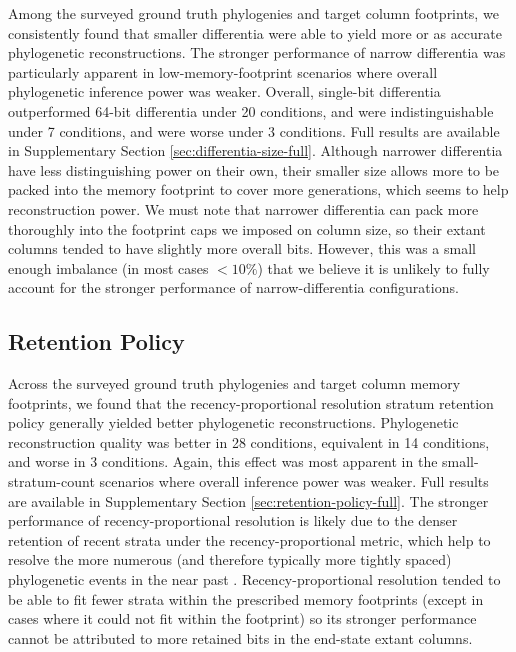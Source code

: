 Among the surveyed ground truth phylogenies and target column footprints, we consistently found that smaller differentia were able to yield more or as accurate phylogenetic reconstructions.
The stronger performance of narrow differentia was particularly apparent in low-memory-footprint scenarios where overall phylogenetic inference power was weaker.
Overall, single-bit differentia outperformed 64-bit differentia under 20 conditions, and were indistinguishable under 7 conditions, and were worse under 3 conditions.
Full results are available in Supplementary Section \ref{sec:differentia-size-full}.
Although narrower differentia have less distinguishing power on their own, their smaller size allows more to be packed into the memory footprint to cover more generations, which seems to help reconstruction power.
We must note that narrower differentia can pack more thoroughly into the footprint caps we imposed on column size, so their extant columns tended to have slightly more overall bits.
However, this was a small enough imbalance (in most cases $<10\%$) that we believe it is unlikely to fully account for the stronger performance of narrow-differentia configurations.

\subsection{Retention Policy}

Across the surveyed ground truth phylogenies and target column memory footprints, we found that the recency-proportional resolution stratum retention policy generally yielded better phylogenetic reconstructions.
Phylogenetic reconstruction quality was better in 28 conditions, equivalent in 14 conditions, and worse in 3 conditions.
Again, this effect was most apparent in the small-stratum-count scenarios where overall inference power was weaker.
Full results are available in Supplementary Section \ref{sec:retention-policy-full}.
The stronger performance of recency-proportional resolution is likely due to the denser retention of recent strata under the recency-proportional metric, which help to resolve the more numerous (and therefore typically more tightly spaced) phylogenetic events in the near past \citep{zhaxybayeva2004cladogenesis}.
Recency-proportional resolution tended to be able to fit fewer strata within the prescribed memory footprints (except in cases where it could not fit within the footprint) so its stronger performance cannot be attributed to more retained bits in the end-state extant columns.
